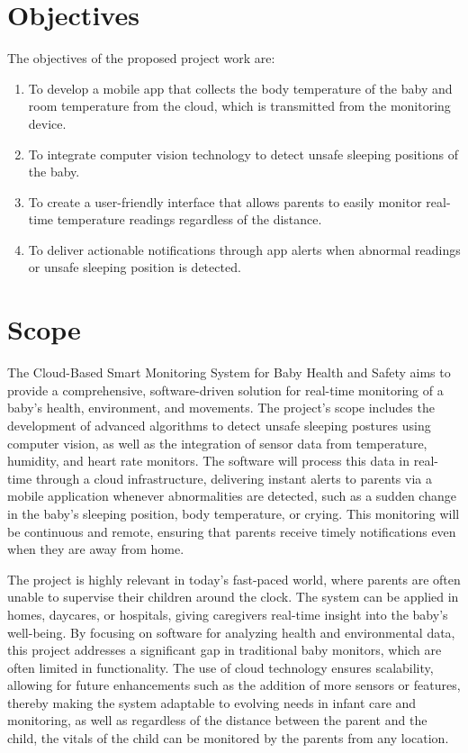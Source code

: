 \documentclass[12pt,a4paper]{report}
\begin{document}
\section{Objectives}
The objectives of the proposed project work are:
\begin{enumerate}
    \item To develop a mobile app that collects the body temperature of the baby and room temperature from the cloud, which is transmitted from the monitoring device.
    \item To integrate computer vision technology to detect unsafe sleeping positions of the baby.
    \item To create a user-friendly interface that allows parents to easily monitor real-time temperature readings regardless of the distance.
    \item To deliver actionable notifications through app alerts when abnormal readings or unsafe sleeping position is detected.
\end{enumerate}
\section{Scope}
The Cloud-Based Smart Monitoring System for Baby Health and Safety aims to provide a comprehensive, software-driven solution for real-time monitoring of a baby’s health, environment, and movements. The project’s scope includes the development of advanced algorithms to detect unsafe sleeping postures using computer vision, as well as the integration of sensor data from temperature, humidity, and heart rate monitors. The software will process this data in real-time through a cloud infrastructure, delivering instant alerts to parents via a mobile application whenever abnormalities are detected, such as a sudden change in the baby’s sleeping position, body temperature, or crying. This monitoring will be continuous and remote, ensuring that parents receive timely notifications even when they are away from home.

The project is highly relevant in today's fast-paced world, where parents are often unable to supervise their children around the clock. The system can be applied in homes, daycares, or hospitals, giving caregivers real-time insight into the baby’s well-being. By focusing on software for analyzing health and environmental data, this project addresses a significant gap in traditional baby monitors, which are often limited in functionality. The use of cloud technology ensures scalability, allowing for future enhancements such as the addition of more sensors or features, thereby making the system adaptable to evolving needs in infant care and monitoring, as well as regardless of the distance between the parent and the child, the vitals of the child can be monitored by the parents from any location.
\end{document}
